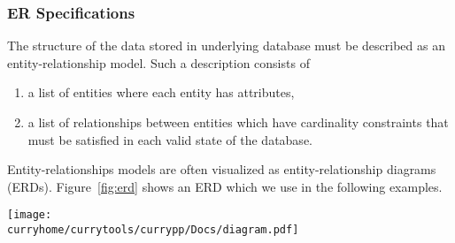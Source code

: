 \subsubsection{ER Specifications}
\label{sec:erd2cdbi}

The structure of the data stored in underlying database
must be described as an entity-relationship model.
Such a description consists of
\begin{enumerate}
\item a list of entities where each entity has attributes,
\item a list of relationships between entities which have
      cardinality constraints that must be satisfied
      in each valid state of the database.
\end{enumerate}
%
Entity-relationships models are often visualized as
entity-relationship diagrams (ERDs).
Figure~\ref{fig:erd} shows an ERD which we use in the following examples.

\begin{figure*}[t]
\begin{center}
  \texttt{[image: \\curryhome/currytools/currypp/Docs/diagram.pdf]}
\end{center}
\caption{A simple entity-relationship diagram for university lectures \cite{HanusKrone16WFLP}}
\label{fig:erd}
\end{figure*}

